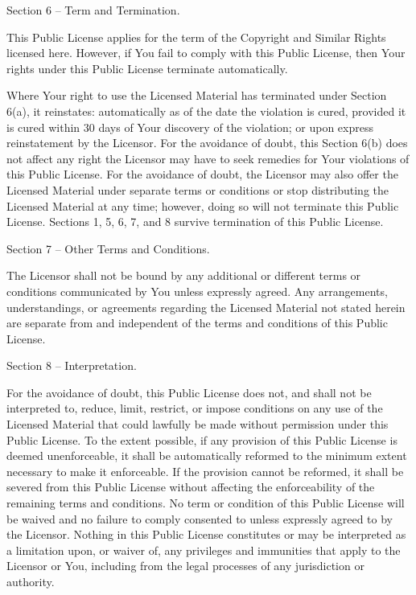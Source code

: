 Section 6 – Term and Termination.

    This Public License applies for the term of the Copyright and Similar Rights licensed here. However, if You fail to comply with this Public License, then Your rights under this Public License terminate automatically.

    Where Your right to use the Licensed Material has terminated under Section 6(a), it reinstates:
        automatically as of the date the violation is cured, provided it is cured within 30 days of Your discovery of the violation; or
        upon express reinstatement by the Licensor.
    For the avoidance of doubt, this Section 6(b) does not affect any right the Licensor may have to seek remedies for Your violations of this Public License.
    For the avoidance of doubt, the Licensor may also offer the Licensed Material under separate terms or conditions or stop distributing the Licensed Material at any time; however, doing so will not terminate this Public License.
    Sections 1, 5, 6, 7, and 8 survive termination of this Public License.

Section 7 – Other Terms and Conditions.

    The Licensor shall not be bound by any additional or different terms or conditions communicated by You unless expressly agreed.
    Any arrangements, understandings, or agreements regarding the Licensed Material not stated herein are separate from and independent of the terms and conditions of this Public License.

Section 8 – Interpretation.

    For the avoidance of doubt, this Public License does not, and shall not be interpreted to, reduce, limit, restrict, or impose conditions on any use of the Licensed Material that could lawfully be made without permission under this Public License.
    To the extent possible, if any provision of this Public License is deemed unenforceable, it shall be automatically reformed to the minimum extent necessary to make it enforceable. If the provision cannot be reformed, it shall be severed from this Public License without affecting the enforceability of the remaining terms and conditions.
    No term or condition of this Public License will be waived and no failure to comply consented to unless expressly agreed to by the Licensor.
    Nothing in this Public License constitutes or may be interpreted as a limitation upon, or waiver of, any privileges and immunities that apply to the Licensor or You, including from the legal processes of any jurisdiction or authority.
